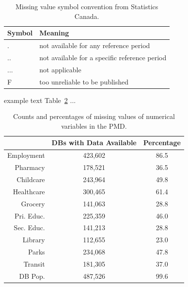 \documentclass[11pt, a4paper]{article}
\begin{document}
\begin{table}[H]
\centering
\caption[Missing value symbols]{Missing value symbol convention from Statistics Canada.}\label{missingvalues}
\begin{tabular}{|l|l|} 
\hline
\textbf{Symbol} & \textbf{Meaning} \\
\hline
. & not available for any reference period \\ 
\hline 
.. & not available for a specific reference period \\ 
\hline 
... & not applicable \\ 
\hline 
F & too unreliable to be published \\ 
\hline 
\end{tabular}
\end{table}







example text Table~\ref{missingdata} ...



\begin{table}[ht]
\centering
\caption[Missing data]{Counts and percentages of missing values of numerical variables in the PMD.}\label{missingdata}
\begin{tabular}{|rcc|}
  \hline
 & DBs with Data Available & Percentage \\ 
  \hline
Employment & 423,602 & 86.5 \\ 
  Pharmacy & 178,521 & 36.5 \\ 
  Childcare & 243,964 & 49.8 \\ 
  Healthcare & 300,465 & 61.4 \\ 
  Grocery & 141,063 & 28.8 \\ 
  Pri. Educ. & 225,359 & 46.0 \\ 
  Sec. Educ. & 141,213 & 28.8 \\ 
  Library & 112,655 & 23.0 \\ 
  Parks & 234,068 & 47.8 \\ 
  Transit & 181,305 & 37.0 \\ 
  DB Pop. & 487,526 & 99.6 \\ 
   \hline
\end{tabular}
\end{table}
\end{document}
